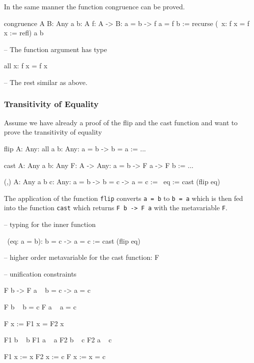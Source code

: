 In the same manner the function congruence can be proved.

\begin{alba}
    congruence {A B: Any} {a b: A} {f: A -> B}: a = b -> f a = f b
    :=
        recurse (\ x: f x = f x := refl) a b

        -- The function argument has type

            all x: f x = f x

        -- The rest similar as above.
\end{alba}







\subsubsection{Transitivity of Equality}


Assume we have already a proof of the flip and the cast function and want to
prove the transitivity of equality

\begin{alba}
    flip {A: Any}: all {a b: Any}: a = b -> b = a
    :=
        ...

    cast {A: Any} {a b: Any} {F: A -> Any}: a = b -> F a -> F b
    :=
        ...

    (,) {A: Any} {a b c: Any}: a = b -> b = c -> a = c
    :=
        \ eq := cast (flip eq)
\end{alba}

The application of the function {\tt flip} converts {\tt a = b} to {\tt b = a}
which is then fed into the function {\tt cast} which returns {\tt F b -> F a}
with the metavariable {\tt F}.

\begin{alba}
    -- typing for the inner function

        \ (eq: a = b): b = c -> a = c := cast (flip eq)

    -- higher order metavariable for the cast function: F

    -- unification constraints

        F b -> F a    ~  b = c -> a = c

        F b     ~       b = c
        F a     ~       a = c

            F x := F1 x = F2 x

            F1 b ~ b
            F1 a ~ a
            F2 b ~ c
            F2 a ~ c

                F1 x := x
                F2 x := c
                F x := x = c
\end{alba}

